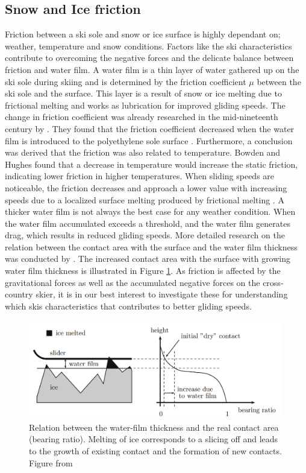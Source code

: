 \subsection{Snow and Ice friction}
\label{subsec:skisandsnow}
Friction between a ski sole and snow or ice surface is highly dependant on; weather, temperature and snow conditions. Factors like the ski characteristics contribute to overcoming the negative forces and the delicate balance between friction and water film. A water film is a thin layer of water gathered up on the ski sole during skiing and is determined by the friction coefficient $\mu$ between the ski sole and the surface. This layer is a result of snow or ice melting due to frictional melting and works as lubrication for improved gliding speeds. The change in friction coefficient was already researched in the mid-nineteenth century by \citep{bowden1939mechanism}. They found that the friction coefficient decreased when the water film is introduced to the polyethylene sole surface \citep{bowden1939mechanism}.
Furthermore, a conclusion was derived that the friction was also related to temperature. Bowden and Hughes found that a decrease in temperature would increase the static friction, indicating lower friction in higher temperatures. 
When sliding speeds are noticeable, the friction decreases and approach a lower value with increasing speeds due to a localized surface melting produced by frictional melting \citep{bowden1953friction}.
A thicker water film is not always the best case for any weather condition. When the water film accumulated exceeds a threshold, and the water film generates drag, which results in reduced gliding speeds. 
More detailed research on the relation between the contact area with the surface and the water film thickness was conducted by \cite{baurle2006sliding}. The increased contact area with the surface with growing water film thickness is illustrated in Figure \ref{fig:waterfilm}. 
As friction is affected by the gravitational forces as well as the accumulated negative forces on the cross-country skier, it is in our best interest to investigate these for understanding which skis characteristics that contributes to better gliding speeds.
\begin{figure}[!htb]
     \centering
     \includegraphics[width=0.99\textwidth]{figures/waterfilm.png}
     \caption{Relation between the water-film thickness and the real contact area (bearing ratio). Melting of ice corresponds to a slicing off and leads to the growth of existing contact and the formation of new contacts. Figure from \citep{baurle2006sliding}}
     \label{fig:waterfilm}
\end{figure}

